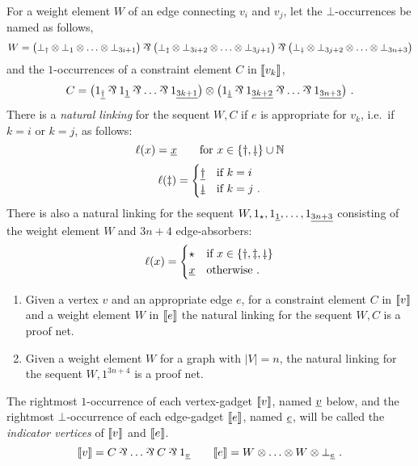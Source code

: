 For a weight element $W$ of an edge connecting $v_i$ and $v_j$, let the $\bot$-occurrences be named as follows,
\[
	W =  \big(\named{    \dagger}\bot\tn\named{   1}\bot\tn\dotsc\tn\named{3i+1}\bot\big)
	\parr\big(\named{   \ddagger}\bot\tn\named{3i+2}\bot\tn\dotsc\tn\named{3j+1}\bot\big)
	\parr\big(\named{\downdagger}\bot\tn\named{3j+2}\bot\tn\dotsc\tn\named{3n+3}\bot\big)
\]
and the $1$-occurrences of a constraint element $C$ in $\itn{v_k}$,
\[
	C = \big(\named{\alt    \dagger}1\parr\named{\alt{   1}}1\parr\dotso\parr\named{\alt{3k+1}}1\big)
	\tn \big(\named{\alt\downdagger}1\parr\named{\alt{3k+2}}1\parr\dotso\parr\named{\alt{3n+3}}1\big)~.
\]
There is a \emph{natural linking} for the sequent $W,C$ if $e$ is appropriate for $v_k$, i.e.\ if $k=i$ or $k=j$, as follows:
\[
	\links(x) = \alt x \qquad \text{for }x\in\{\dagger,\downdagger\}\cup\mathbb N
\]
\[
	\links(\ddagger)=
	\begin{cases}
		\alt	\dagger & \text{if }k=i \\
		\alt\downdagger & \text{if }k=j~.
	\end{cases}
\]
There is also a natural linking for the sequent $W,\named\star 1,\named{\alt 1}1,\dotsc,\named{\alt {3n+3}}1$ consisting of the weight element $W$ and $3n+4$ edge-absorbers:
\[
	\links(x)=
	\begin{cases}
		\star  & \text{if }x\in\{\dagger,\ddagger,\downdagger\} \\
		\alt x & \text{otherwise }.
	\end{cases}
\]


\begin{proposition}
\label{prop:element linkings}
\begin{enumerate}
	\item
Given a vertex $v$ and an appropriate edge $e$, for a constraint element $C$ in $\itn v$ and a weight element $W$ in $\itn e$ the natural linking for the sequent $W,C$ is a proof net.
	\item
Given a weight element $W$ for a graph with $|V|=n$, the natural linking for the sequent $W,1^{3n+4}$ is a proof net.
\end{enumerate}
\end{proposition}


The rightmost $1$-occurrence of each vertex-gadget $\itn v$, named $\alt v$ below, and the rightmost $\bot$-occurrence of each edge-gadget $\itn e$, named $\alt e$, will be called the \emph{indicator vertices} of $\itn v$ and $\itn e$.
\[	
	\itn v = C\parr\dotso\parr C\parr \named{\alt v}1 \qquad \itn e= W\tn\dotso\tn W\tn\named{\alt e}\bot~.
\]


